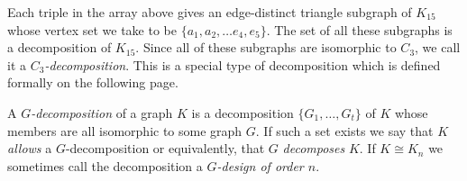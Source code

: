\normalfont Each triple in the array above gives an edge-distinct triangle subgraph of $K_{15}$ whose vertex set we take to be $\{a_{1},a_{2},\hdots e_{4},e_{5}\}.$ The set of all these subgraphs is a decomposition of $K_{15}$. Since all of these subgraphs are isomorphic to $C_{3}$, we call it a \textit{$C_{3}$-decomposition}. This is a special type of decomposition which is defined formally on the following page.\newpage

\begin{definition}[$G$-decomposition]
A \textit{$G$-decomposition} of a graph $K$ is a decomposition $\{G_{1},\hdots,G_{t}\}$ of $K$ whose members are all isomorphic to some graph $G$. If such a set exists we say that $K$ \textit{allows} a $G$-decomposition or equivalently, that $G$ \textit{decomposes} $K$. If $K\cong K_{n}$ we sometimes call the decomposition a \textit{$G$-design of order $n$}.
\end{definition}

